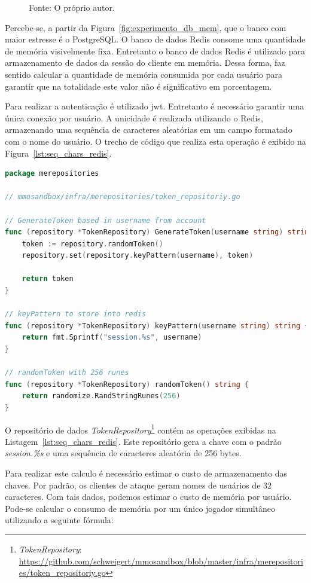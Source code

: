 \begin{figure}[htb!]
    Fonte: O próprio autor.
\end{figure}

Percebe-se, a partir da Figura~\ref{fig:experimento_db_mem}, que o banco com maior estresse é o PostgreSQL.
%
O banco de dados Redis consome uma quantidade de memória visivelmente fixa.
%
Entretanto o banco de dados Redis é utilizado para armazenamento de dados da sessão do cliente em memória.
%
Dessa forma, faz sentido calcular a quantidade de memória consumida por cada usuário para garantir que na totalidade este valor não é significativo em porcentagem.

Para realizar a autenticação é utilizado \ac{jwt}.
%
Entretanto é necessário garantir uma única conexão por usuário.
%
A unicidade é realizada utilizando o Redis, armazenando uma sequência de caracteres aleatórias em um campo formatado com o nome do usuário.
%
O trecho de código que realiza esta operação é exibido na Figura~\ref{lst:seq_chars_redis}.



\begin{lstlisting}[language=go,firstnumber=1, caption={Informações do Bloco},label={lst:seq_chars_redis}]
package merepositories

// mmosandbox/infra/merepositories/token_repositoriy.go

// GenerateToken based in username from account
func (repository *TokenRepository) GenerateToken(username string) string {
    token := repository.randomToken()
    repository.set(repository.keyPattern(username), token)

    return token
}

// keyPattern to store into redis
func (repository *TokenRepository) keyPattern(username string) string {
    return fmt.Sprintf("session.%s", username)
}

// randomToken with 256 runes
func (repository *TokenRepository) randomToken() string {
    return randomize.RandStringRunes(256)
}
\end{lstlisting}

O repositório de dados \textit{TokenRepository}\footnote{\textit{TokenRepository}: \url{https://github.com/schweigert/mmosandbox/blob/master/infra/merepositories/token_repositoriy.go}} contém as operações exibidas na Listagem~\ref{lst:seq_chars_redis}.
%
Este repositório gera a chave com o padrão \textit{session.\%s} e uma sequência de caracteres aleatória de 256 bytes.

Para realizar este calculo é necessário estimar o custo de armazenamento das chaves.
%
Por padrão, os clientes de ataque geram nomes de usuários de 32 caracteres.
%
Com tais dados, podemos estimar o custo de memória por usuário.
%
Pode-se calcular o consumo de memória por um único jogador simultâneo utilizando a seguinte fórmula:

